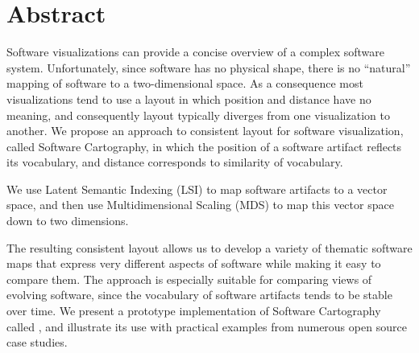   \newenvironment{abstract}{%
        \small
        \begin{center}%
          {\bfseries \abstractname\vspace{-.5em}\vspace{0pt}}%
        \end{center}%
        \quotation
      }%
      {\endquotation}

\chapter{Abstract}
Software visualizations can provide a concise overview of a complex software system. Unfortunately, since software has no physical shape, there is no “natural” mapping of software to a two-dimensional space. As a consequence most visualizations tend to use a layout in which position and distance have no meaning, and consequently layout typically diverges from one visualization to another. We propose an approach to consistent layout for software visualization, called Software Cartography, in which the position of a software artifact reflects its vocabulary, and distance corresponds to similarity of vocabulary.

We use Latent Semantic Indexing (LSI) to map software artifacts to a vector space, and then use Multidimensional Scaling (MDS) to map this vector space down to two dimensions.


The resulting consistent layout allows us to develop a variety of thematic software maps that express very different aspects of software while making it easy to compare them. The approach is especially suitable for comparing views of evolving software, since the vocabulary of software artifacts tends to be stable over time. We present a prototype implementation of Software Cartography called \cmap, and illustrate its use with practical examples from numerous open source case studies.


